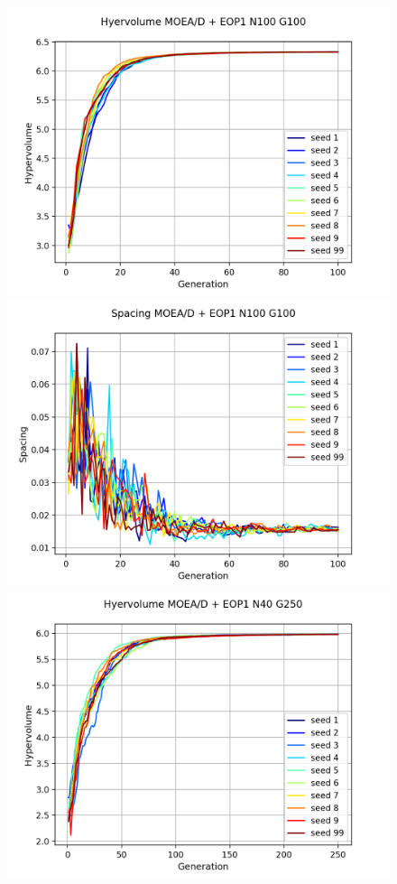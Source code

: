 \begin{figure}[H]
\centering
\includegraphics[scale=0.5]{figures/METRICS_EOP1/Hypervol_N100_G100.png} \quad 
\includegraphics[scale=0.5]{figures/METRICS_EOP1/Spacing_N100_G100.png}\\
\includegraphics[scale=0.5]{figures/METRICS_EOP1/Hypervol_N40_G250.png}\quad 

\end{figure}

